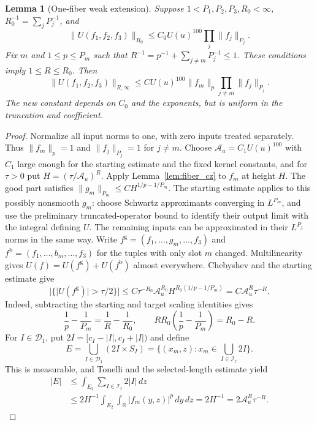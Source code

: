 \documentclass[12pt,reqno]{amsart}
\theoremstyle{plain}
\newtheorem{lemma}[theorem]{Lemma}
\theoremstyle{definition}
\theoremstyle{remark}
\numberwithin{equation}{section}
\newcommand{\R}{\mathbb R}
\newcommand{\dd}{\,d}
\begin{document}
\begin{lemma}[One-fiber weak extension]\label{lem:one_fiber}
Suppose $1<P_1,P_2,P_3,R_0<\infty$,
$R_0^{-1}=\sum_jP_j^{-1}$, and
\[
 \|U(f_1,f_2,f_3)\|_{R_0}\le C_0U(u)^{100}\prod_j\|f_j\|_{P_j}.
\]
Fix $m$ and $1\le p\le P_m$ such that
$R^{-1}=p^{-1}+\sum_{j\ne m}P_j^{-1}\le1$.
These conditions imply $1\le R\le R_0$.
Then
\begin{equation}\label{eq:one_fiber}
 \|U(f_1,f_2,f_3)\|_{R,\infty}
 \le C U(u)^{100}\|f_m\|_p\prod_{j\ne m}\|f_j\|_{P_j}.
\end{equation}
The new constant depends on $C_0$ and the exponents, but is uniform
in the truncation and coefficient.
\end{lemma}
\begin{proof}
Normalize all input norms to one, with zero inputs treated separately.
Thus $\|f_m\|_p=1$ and $\|f_j\|_{P_j}=1$ for $j\ne m$.
Choose $\mathcal A_u=C_1U(u)^{100}$ with $C_1$ large enough for
the starting estimate and the fixed kernel constants, and for
$\tau>0$ put $H=(\tau/\mathcal A_u)^R$.
Apply Lemma~\ref{lem:fiber_cz} to $f_m$ at height $H$.
The good part satisfies $\|g_m\|_{P_m}\le C H^{1/p-1/P_m}$.
The starting estimate applies to this possibly nonsmooth $g_m$:
choose Schwartz approximants converging in $L^{P_m}$, and use the
preliminary truncated-operator bound to identify their output limit
with the integral defining $U$. The remaining inputs can be
approximated in their $L^{P_j}$ norms in the same way.
Write $f^{\mathrm g}=(f_1,\ldots,g_m,\ldots,f_3)$ and
$f^{\mathrm b}=(f_1,\ldots,b_m,\ldots,f_3)$ for the tuples with
only slot $m$ changed. Multilinearity gives $U(f)=U(f^{\mathrm g})+
U(f^{\mathrm b})$ almost everywhere. Chebyshev and the starting
estimate give
\[
 |\{|U(f^{\mathrm g})|>\tau/2\}|
 \le C\tau^{-R_0}\mathcal A_u^{R_0}H^{R_0(1/p-1/P_m)}
 = C\mathcal A_u^R\tau^{-R}.
\]
Indeed, subtracting the starting and target scaling identities gives
\[
 \frac1p-\frac1{P_m}=\frac1R-\frac1{R_0},\qquad
 RR_0\left(\frac1p-\frac1{P_m}\right)=R_0-R.
\]
For $I\in\mathcal D_1$, put
$2I=[c_I-|I|,c_I+|I|)$ and define
\begin{equation}\label{eq:cz_exceptional_set}
 E=\bigcup_{I\in\mathcal D_1}(2I\times S_I)
  =\{(x_m,z):x_m\in\bigcup_{I\in\mathcal I_z}2I\}.
\end{equation}
This is measurable, and Tonelli and the selected-length estimate yield
\begin{align*}
 |E|&\le\int_{E_2}\sum_{I\in\mathcal I_z}2|I|\dd z\\
 &\le2H^{-1}\int_{E_2}\int_\R|f_m(y,z)|^p\dd y\dd z
  =2H^{-1}=2\mathcal A_u^R\tau^{-R}.
\end{align*}


\end{proof}
\end{document}
